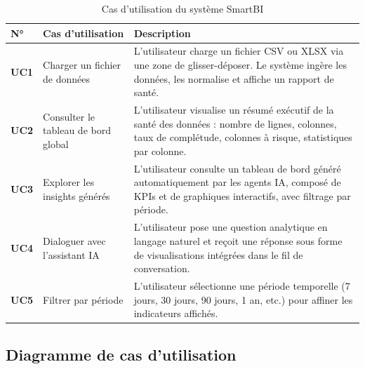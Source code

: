 \begin{table}[H]
\centering
\caption{Cas d'utilisation du système SmartBI}
\label{tab:cas-utilisation}
\begin{tabularx}{\textwidth}{>{\bfseries}p{0.8cm} p{4cm} X}
\toprule
\textbf{N°} & \textbf{Cas d'utilisation} & \textbf{Description} \\
\midrule
UC1 & Charger un fichier de données & L'utilisateur charge un fichier CSV ou XLSX via une zone de glisser-déposer. Le système ingère les données, les normalise et affiche un rapport de santé. \\
UC2 & Consulter le tableau de bord global & L'utilisateur visualise un résumé exécutif de la santé des données : nombre de lignes, colonnes, taux de complétude, colonnes à risque, statistiques par colonne. \\
UC3 & Explorer les insights générés & L'utilisateur consulte un tableau de bord généré automatiquement par les agents IA, composé de KPIs et de graphiques interactifs, avec filtrage par période. \\
UC4 & Dialoguer avec l'assistant IA & L'utilisateur pose une question analytique en langage naturel et reçoit une réponse sous forme de visualisations intégrées dans le fil de conversation. \\
UC5 & Filtrer par période & L'utilisateur sélectionne une période temporelle (7 jours, 30 jours, 90 jours, 1 an, etc.) pour affiner les indicateurs affichés. \\
\bottomrule
\end{tabularx}
\end{table}

\subsection{Diagramme de cas d'utilisation}

